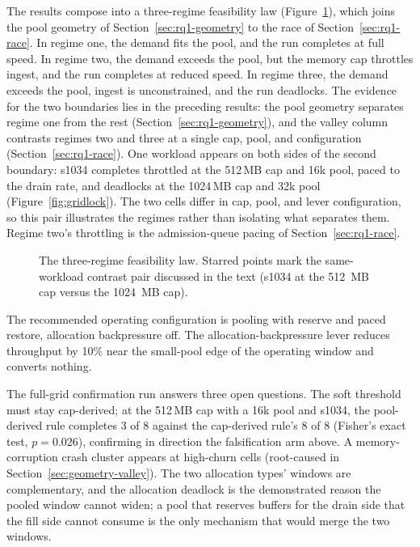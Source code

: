 The results compose into a three-regime feasibility law (Figure~\ref{fig:regimes}), which joins the pool geometry of Section~\ref{sec:rq1-geometry} to the race of Section~\ref{sec:rq1-race}.
In regime one, the demand fits the pool, and the run completes at full speed.
In regime two, the demand exceeds the pool, but the memory cap throttles ingest, and the run completes at reduced speed.
In regime three, the demand exceeds the pool, ingest is unconstrained, and the run deadlocks.
The evidence for the two boundaries lies in the preceding results: the pool geometry separates regime one from the rest (Section~\ref{sec:rq1-geometry}), and the valley column contrasts regimes two and three at a single cap, pool, and configuration (Section~\ref{sec:rq1-race}).
One workload appears on both sides of the second boundary: s1034 completes throttled at the 512\,MB cap and 16k pool, paced to the drain rate, and deadlocks at the 1024\,MB cap and 32k pool (Figure~\ref{fig:gridlock}).
The two cells differ in cap, pool, and lever configuration, so this pair illustrates the regimes rather than isolating what separates them.
Regime two's throttling is the admission-queue pacing of Section~\ref{sec:rq1-race}.

\begin{figure}[htbp]
\centering
{}
\caption[The three-regime feasibility law]{The three-regime feasibility law.
Starred points mark the same-workload contrast pair discussed in the text
(s1034 at the 512\, MB cap versus the 1024\, MB cap).\methodsnote}
\label{fig:regimes}
\end{figure}

The recommended operating configuration is pooling with reserve and paced restore, allocation backpressure off.
The allocation-backpressure lever reduces throughput by 10\% near the small-pool edge of the operating window and converts nothing.

The full-grid confirmation run answers three open questions.
The soft threshold must stay cap-derived; at the 512\,MB cap with a 16k pool and s1034, the pool-derived rule completes 3 of 8 against the cap-derived rule's 8 of 8 (Fisher's exact test, $p = 0.026$), confirming in direction the falsification arm above.
A memory-corruption crash cluster appears at high-churn cells (root-caused in Section~\ref{sec:geometry-valley}).
The two allocation types' windows are complementary, and the allocation deadlock is the demonstrated reason the pooled window cannot widen; a pool that reserves buffers for the drain side that the fill side cannot consume is the only mechanism that would merge the two windows.

